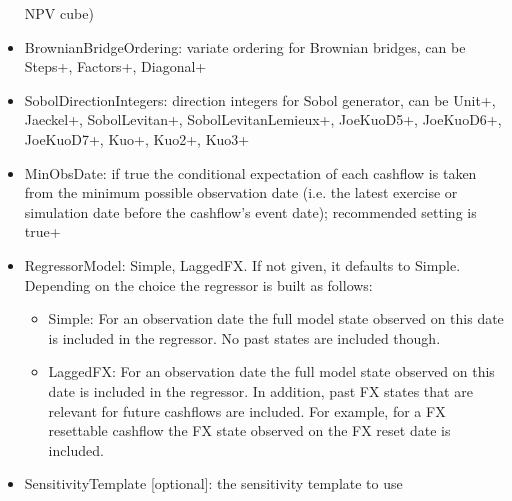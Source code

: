 \begin{itemize}
  NPV cube)
\item BrownianBridgeOrdering: variate ordering for Brownian bridges, can be Steps+, Factors+, Diagonal+
\item SobolDirectionIntegers: direction integers for Sobol generator, can be Unit+, Jaeckel+, SobolLevitan+,
  SobolLevitanLemieux+, JoeKuoD5+, JoeKuoD6+, JoeKuoD7+, Kuo+, Kuo2+, Kuo3+
\item MinObsDate: if true the conditional expectation of each cashflow is taken from the minimum possible observation
  date (i.e. the latest exercise or simulation date before the cashflow's event date); recommended setting is true+
\item RegressorModel: Simple, LaggedFX. If not given, it defaults to Simple. Depending on the choice the regressor is
  built as follows:
  \begin{itemize}
    \item Simple: For an observation date the full model state observed on this date is included in the regressor. No
      past states are included though.
    \item LaggedFX: For an observation date the full model state observed on this date is included in the regressor. In
      addition, past FX states that are relevant for future cashflows are included. For example, for a FX resettable
      cashflow the FX state observed on the FX reset date is included.
  \end{itemize}
\item SensitivityTemplate [optional]: the sensitivity template to use
\end{itemize}

